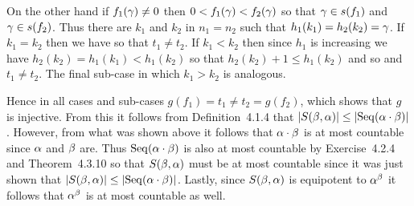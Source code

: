 {{    On the other hand if $f_1(\gamma) \neq 0$ then $0 < f_1(\gamma) < f_2(\gamma)$ so that $\gamma \in s(f_1)$ and $\gamma \in s(f_2)$.
    Thus there are $k_1$ and $k_2$ in $n_1 = n_2$ such that $h_1(k_1) = h_2(k_2) = \gamma$.
    If $k_1 = k_2$ then we have
    so that $t_1 \neq  t_2$.
    If $k_1 < k_2$ then since $h_1$ is increasing we have $h_2(k_2) = h_1(k_1) < h_1(k_2)$ so that $h_2(k_2) + 1 \leq h_1(k_2)$ and so
    and $t_1 \neq t_2$.
    The final sub-case in which $k_1 > k_2$ is analogous.

    Hence in all cases and sub-cases $g(f_1) = t_1 \neq t_2 = g(f_2)$, which shows that $g$ is injective.
    From this it follows from Definition~4.1.4 that $\left| S(\beta, \alpha) \right| \leq \left| \mathrm{Seq}(\alpha \cdot \beta) \right|$.
    However, from what was shown above it follows that $\alpha \cdot \beta$ is at most countable since $\alpha$ and $\beta$ are.
    Thus $\mathrm{Seq}(\alpha \cdot \beta)$ is also at most countable by Exercise~4.2.4 and Theorem~4.3.10 so that $S(\beta, \alpha)$ must be at most countable since it was just shown that $\left| S(\beta, \alpha) \right| \leq \left| \mathrm{Seq}(\alpha \cdot \beta) \right|$.
    Lastly, since $S(\beta, \alpha)$ is equipotent to $\alpha^\beta$ it follows that $\alpha^\beta$ is at most countable as well.
  }
}

